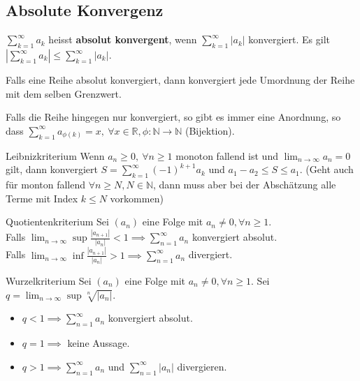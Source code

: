 \documentclass[a4paper,fontsize = 7pt]{scrartcl}
\def\limn{\lim_{n\to \infty}}
\def\sumk{\sum_{k=1}^\infty}
\def\R{\mathbb{R}}
\def\N{\mathbb{N}}
\begin{document}
\subsection{Absolute Konvergenz}
$\sumk a_k$ heisst \textbf{absolut konvergent}, wenn $\sumk |a_k|$ konvergiert. Es gilt $|\sumk a_k| \le \sumk |a_k|$.

Falls eine Reihe absolut konvergiert, dann konvergiert jede Umordnung der Reihe mit dem selben Grenzwert.

Falls die Reihe hingegen nur konvergiert, so gibt es immer eine Anordnung, so dass $\sum_{k=1}^\infty a_{\phi(k)} = x, \ \forall x\in \R, \phi: \N \to \N$ (Bijektion).

\begin{subbox}{Leibnizkriterium}
  \vspace{-4pt}
Wenn $a_n \ge 0, \ \forall n \ge 1$ monoton fallend ist und $\limn a_n = 0$ gilt, dann konvergiert $S = \sumk (-1)^{k+1} a_k$ und $a_1 - a_2 \le S \le a_1$.
(Geht auch für monton fallend $\forall n \geq N, N \in \N$, dann muss aber bei der Abschätzung alle Terme mit Index $k \leq N$ vorkommen)
  \vspace{-4pt}
\end{subbox}

\begin{mainbox}{Quotientenkriterium}
  \vspace{-4pt}
Sei $(a_n)$ eine Folge mit $a_n \ne 0, \forall n \ge 1$. \\ Falls $\limn \sup \frac{|a_{n+1}|}{|a_n|} < 1 \implies \sum_{n=1}^\infty a_n$ konvergiert absolut. \\Falls $\limn \inf \frac{|a_{n+1}|}{|a_n|} > 1 \implies \sum_{n=1}^\infty a_n$ divergiert.  
  \vspace{-4pt}
\end{mainbox}

\begin{mainbox}{Wurzelkriterium}
  \vspace{-4pt}
  Sei $(a_n)$ eine Folge mit $a_n \ne 0, \forall n \ge 1$. Sei $q = \limn \sup \sqrt[n]{|a_n|}$. 
\begin{itemize}
 \item $q < 1 \implies \sum_{n=1}^\infty a_n$ konvergiert absolut.
 \item $q = 1 \implies$ keine Aussage.
 \item $q > 1 \implies \sum_{n=1}^\infty a_n$ und $\sum_{n=1}^\infty |a_n|$ divergieren.
\end{itemize}
\vspace{-12pt}
\end{mainbox}
\end{document}
